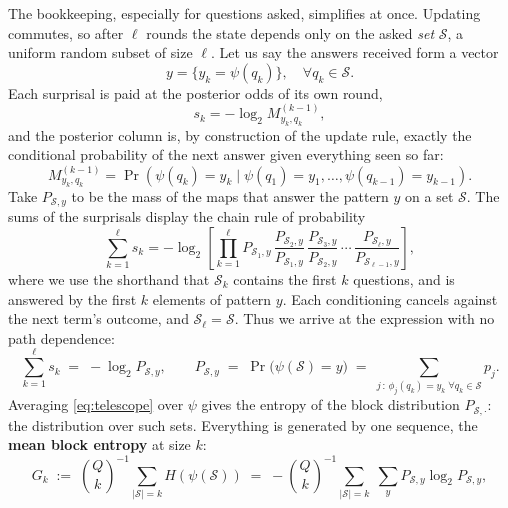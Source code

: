 \documentclass[11pt]{article}
\begin{document}
The bookkeeping, especially for questions asked, simplifies at once. Updating commutes, so after
$\ell$ rounds the state depends only on the asked \emph{set} $\mathcal S$,
a uniform random subset of size $\ell$. Let us say the answers
received form a vector 
\begin{equation}
  y = \{y_k = \psi(q_k)\},\quad \forall q_k \in \mathcal S. 
\end{equation}
Each surprisal is
paid at the posterior odds of its own round,
\begin{equation}
  s_k = -\log_2 M^{(k-1)}_{y_k, q_k},
\end{equation}
and the posterior column is,
by construction of the update rule, exactly the conditional
probability of the next answer given everything seen so far:
\begin{equation}
M^{(k-1)}_{y_k, q_k} = \Pr(\psi(q_k) = y_k \mid \psi(q_1) = y_1,
\ldots, \psi(q_{k-1}) = y_{k-1}). 
\end{equation}
Take $P_{\mathcal S, y}$ to be the mass of
the maps that answer the pattern $y$ on a set $\mathcal S$. 
The sums of the
surprisals display the chain rule of probability
\begin{equation}
\sum_{k=1}^{\ell} s_k = -\log_2 \left[\prod_{k=1}^{\ell}  P_{\mathcal S_1, y}\,
        \frac{P_{\mathcal S_2, y}}{P_{\mathcal S_1, y}}\,
        \frac{P_{\mathcal S_3, y}}{P_{\mathcal S_2, y}}
        \,\cdots\,
        \frac{P_{\mathcal S_\ell, y}}{P_{\mathcal S_{\ell-1}, y}}\right],
\end{equation}
where we use the shorthand that $\mathcal S_k$ contains the first $k$ questions, and is answered by the first $k$ elements of pattern $y$.
Each conditioning cancels against the next term's outcome, and $\mathcal S_\ell = \mathcal S$. Thus we arrive at the expression with no path dependence:
\begin{equation}\label{eq:telescope}
  \sum_{k=1}^{\ell} s_k \;=\; -\log_2 P_{\mathcal S, y},
  \qquad
  P_{\mathcal S, y} \;=\; \Pr\big(\psi(\mathcal S) = y\big)
  \;=\; \sum_{j \,:\, \phi_j(q_k) = y_k \;\forall q_k \in
  \mathcal S} p_j .
\end{equation}
Averaging
\eqref{eq:telescope} over $\psi$ gives the entropy of the block
distribution $P_{\mathcal S,\cdot}$: the distribution over such sets. Everything is generated by
one sequence, the \textbf{mean block entropy} at size $k$:
\begin{equation}\label{eq:Gk}
  G_k \;:=\; \binom{Q}{k}^{-1} \sum_{|\mathcal S| = k}
  H(\psi(\mathcal S))
  \;=\; -\binom{Q}{k}^{-1} \sum_{|\mathcal S| = k}\;
  \sum_{y} P_{\mathcal S,y} \log_2 P_{\mathcal S,y},
\end{equation}
\end{document}
